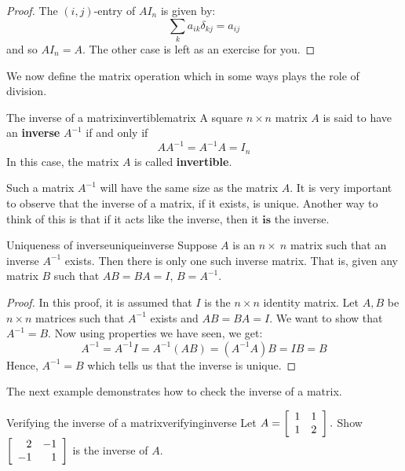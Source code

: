 \begin{proof}
The $(i,j)$-entry of $AI_n$ is given by:
\begin{equation*}
\sum_{k}a_{ik}\delta _{kj}=a_{ij}
\end{equation*}
and so $AI_{n}=A.$ The other case is left as an exercise for you. 
\end{proof}

We now define the matrix operation which in some ways plays the role of division. 

\begin{definition}{The inverse of a matrix}{invertiblematrix}
A square  $n\times n$ matrix $A$ is said to have an \textbf{inverse} $A^{-1}$
if and only if 
\begin{equation*}
AA^{-1}=A^{-1}A=I_n
\end{equation*}
In this case, the matrix $A$ is called
 \textbf{invertible}.
\end{definition}

Such a  matrix $A^{-1}$ will have the same size as the matrix $A$. 
It is very important to observe that the inverse of a matrix, if it exists,
is unique. Another way to think of this is that if it acts like the inverse,
then it $\textbf{is}$ the inverse.

\begin{theorem}{Uniqueness of inverse}{uniqueinverse}
Suppose $A$ is an $n \times\ n$ matrix such that an inverse  $A^{-1}$ exists. Then there is only one such 
inverse matrix. 
That is, given any matrix $B$ such that $AB=BA=I$, $B=A^{-1}$.
\end{theorem}

\begin{proof} In this proof, it is assumed that $I$ is the $n \times n$ identity matrix. 
Let $A, B$ be $n \times n$ matrices such that $A^{-1}$ exists and $AB=BA=I$. 
We want to show that $A^{-1} = B$. 
Now using properties we have seen, we get: 
\begin{equation*}
A^{-1}=A^{-1}I=A^{-1}\left( AB\right) =\left( A^{-1}A\right) B=IB=B
\end{equation*}
Hence, $A^{-1} = B$ which tells us that the inverse is unique.
\end{proof}

The next example demonstrates how to check the inverse of a matrix. 

\begin{example}{Verifying the inverse of a matrix}{verifyinginverse}
Let $A=\left[
\begin{array}{rr}
1 & 1 \\
1 & 2
\end{array}
\right] .$ Show $\left[
\begin{array}{rr}
2 & -1 \\
-1 & 1
\end{array}
\right] $ is the inverse of $A.$
\end{example}

